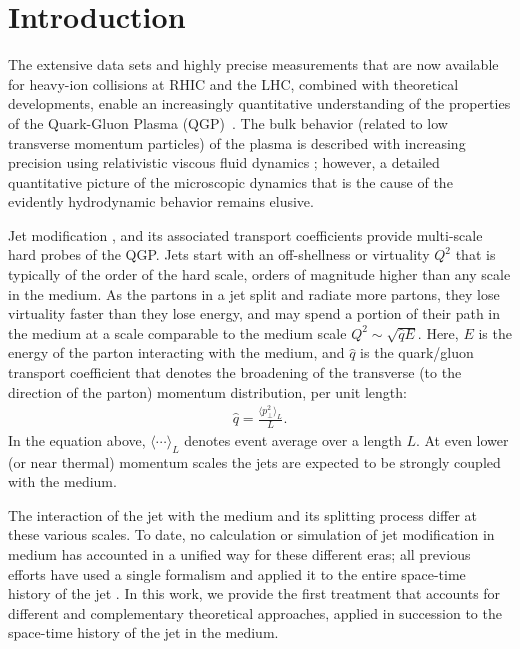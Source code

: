 \documentclass[aps,prc,twocolumn,floatfix,superscriptaddress,nofootinbib]{revtex4}
\begin{document}


\section{Introduction}
\label{sec:introduction}



The extensive data sets and highly precise measurements that are now available for heavy-ion collisions at RHIC and the LHC, combined with theoretical developments, enable  an increasingly quantitative understanding of the properties of the Quark-Gluon Plasma (QGP)~\cite{Heinz:2015tua,Akiba:2015jwa}. The bulk behavior (related to low transverse momentum particles) of the plasma is described with  increasing precision using relativistic viscous fluid dynamics \cite{Romatschke:2007mq,Song:2010mg,Gale:2012rq,Heinz:2013th}; however, a detailed quantitative picture of the microscopic dynamics that is the cause of the evidently hydrodynamic behavior remains elusive. 

Jet modification \cite{Gyulassy:1993hr,Wang:1991xy,Baier:1998yf,Baier:1996sk,Baier:1996kr,Zakharov:1997uu,Zakharov:1996fv,Gyulassy:2003mc,Kovner:2003zj,CasalderreySolana:2007pr,Majumder:2010qh}, and its associated transport coefficients \cite{Baier:2002tc,Majumder:2008zg,Burke:2013yra} provide multi-scale hard probes of the QGP. Jets start with an off-shellness or virtuality $Q^2$ that is typically of the order of the hard scale, orders of magnitude higher than any scale in the medium. As the partons in a jet split and radiate more partons, they lose virtuality faster than they lose energy, and may spend a portion of their path in the medium at a scale comparable to the medium scale $Q^2 \sim \sqrt{\hat{q} E}$. Here, $E$ is the energy of the parton interacting with the medium, and $\hat{q}$ is the quark/gluon transport coefficient that denotes the broadening of the transverse (to the direction of the parton) momentum distribution, per unit length:
\begin{eqnarray}
\hat{q} = \frac{\langle p_\perp^2 \rangle_L}{L}.
\end{eqnarray}
In the equation above, $\langle \cdots \rangle_L$ denotes event average over a length $L$.
At even lower (or near thermal) momentum scales the jets are expected to be strongly coupled with the medium. 

The interaction of the jet with the medium and its splitting process differ at these various scales. To date, no calculation or simulation of jet modification in medium has accounted in a unified way for these different eras; all previous efforts have used a single formalism and applied it to the entire space-time history of the jet \cite{Burke:2013yra}. In this work, we provide the first treatment that accounts for different and complementary theoretical approaches, applied in succession to the space-time history of the jet in the medium. 
\end{document}
